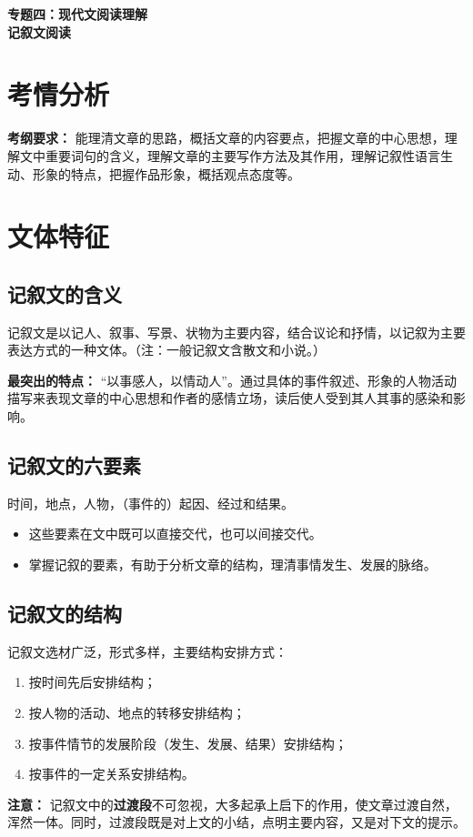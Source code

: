 \documentclass[11pt, a4paper]{ctexart}
\begin{document}
\begin{center}
    {\Huge \bfseries 专题四：现代文阅读理解} \\
    \vspace{1cm}
    {\huge \bfseries 记叙文阅读}
\end{center}

\tableofcontents
\newpage

\section{考情分析}

\textbf{考纲要求：}
能理清文章的思路，概括文章的内容要点，把握文章的中心思想，理解文中重要词句的含义，理解文章的主要写作方法及其作用，理解记叙性语言生动、形象的特点，把握作品形象，概括观点态度等。

\section{文体特征}

\subsection{记叙文的含义}
记叙文是以记人、叙事、写景、状物为主要内容，结合议论和抒情，以记叙为主要表达方式的一种文体。（注：一般记叙文含散文和小说。）

\textbf{最突出的特点：} “以事感人，以情动人”。通过具体的事件叙述、形象的人物活动描写来表现文章的中心思想和作者的感情立场，读后使人受到其人其事的感染和影响。

\subsection{记叙文的六要素}
时间，地点，人物，（事件的）起因、经过和结果。
\begin{itemize}
    \item 这些要素在文中既可以直接交代，也可以间接交代。
    \item 掌握记叙的要素，有助于分析文章的结构，理清事情发生、发展的脉络。
\end{itemize}

\subsection{记叙文的结构}
记叙文选材广泛，形式多样，主要结构安排方式：
\begin{enumerate}
    \item 按时间先后安排结构；
    \item 按人物的活动、地点的转移安排结构；
    \item 按事件情节的发展阶段（发生、发展、结果）安排结构；
    \item 按事件的一定关系安排结构。
\end{enumerate}
\textbf{注意：} 记叙文中的\textbf{过渡段}不可忽视，大多起承上启下的作用，使文章过渡自然，浑然一体。同时，过渡段既是对上文的小结，点明主要内容，又是对下文的提示。
\end{document}
